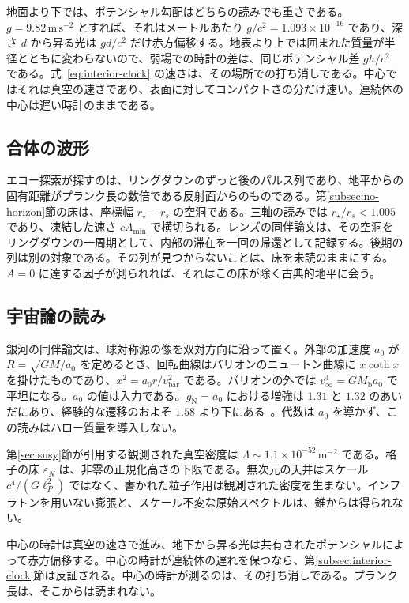 \documentclass[a4paper]{article}
\begin{document}
地面より下では、ポテンシャル勾配はどちらの読みでも重さである。\(g=9.82\,\mathrm{m\,s^{-2}}\) とすれば、それはメートルあたり \(g/c^{2}=1.093\times 10^{-16}\) であり、深さ \(d\) から昇る光は \(gd/c^{2}\) だけ赤方偏移する。地表より上では囲まれた質量が半径とともに変わらないので、弱場での時計の差は、同じポテンシャル差 \(gh/c^{2}\) である。式~\eqref{eq:interior-clock} の速さは、その場所での打ち消しである。中心ではそれは真空の速さであり、表面に対してコンパクトさの分だけ速い。連続体の中心は遅い時計のままである。

\subsection{合体の波形}

エコー探索が探すのは、リングダウンのずっと後のパルス列であり、地平からの固有距離がプランク長の数倍である反射面からのものである。第\ref{subsec:no-horizon}節の床は、座標幅 \(r_\star-r_s\) の空洞である。三軸の読みでは \(r_\star/r_s<1.005\) であり、凍結した速さ \(c A_{\min}\) で横切られる。レンズの同伴論文は、その空洞をリングダウンの一周期として、内部の滞在を一回の帰還として記録する。後期の列は別の対象である。その列が見つからないことは、床を未読のままにする。\(A=0\) に達する因子が測られれば、それはこの床が除く古典的地平に会う。

\subsection{宇宙論の読み}

銀河の同伴論文は、球対称源の像を双対方向に沿って置く。外部の加速度 \(a_0\) が \(R=\sqrt{GM/a_0}\) を定めるとき、回転曲線はバリオンのニュートン曲線に \(x\coth x\) を掛けたものであり、\(x^2=a_0 r/v_{\mathrm{bar}}^2\) である。バリオンの外では \(v_\infty^4=GM_{\mathrm{b}}a_0\) で平坦になる。\(a_0\) の値は入力である。\(g_{\mathrm{N}}=a_0\) における増強は \(1.31\) と \(1.32\) のあいだにあり、経験的な遷移のおよそ \(1.58\) より下にある~\cite{dst-galactic}。代数は \(a_0\) を導かず、この読みはハロー質量を導入しない。

第\ref{sec:susy}節が引用する観測された真空密度は \(\Lambda\sim 1.1\times 10^{-52}\,\mathrm{m}^{-2}\) である。格子の床 \(\varepsilon_N\) は、非零の正規化高さの下限である。無次元の天井はスケール \(c^4/(G\ell_P^2)\) ではなく、書かれた粒子作用は観測された密度を生まない。インフラトンを用いない膨張と、スケール不変な原始スペクトルは、錐からは得られない。

中心の時計は真空の速さで進み、地下から昇る光は共有されたポテンシャルによって赤方偏移する。中心の時計が連続体の遅れを保つなら、第\ref{subsec:interior-clock}節は反証される。中心の時計が測るのは、その打ち消しである。プランク長は、そこからは読まれない。
\end{document}
